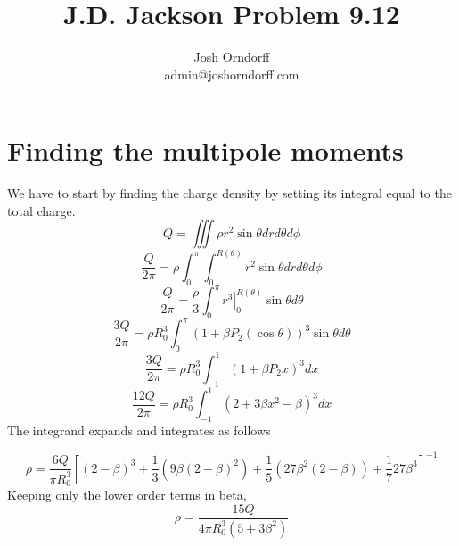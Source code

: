 \documentclass[10pt,a4paper]{article}
\begin{document}
\title{J.D. Jackson Problem 9.12}
\author{Josh Orndorff \\ admin@joshorndorff.com}
\maketitle

\section{Finding the multipole moments}
We have to start by finding the charge density by setting its integral equal to the total charge.
\begin{equation}
Q=\iiint \rho r^2 \sin\theta dr d\theta d\phi
\end{equation}
\begin{equation}
\frac{Q}{2\pi}=\rho\int_0^\pi \int_0^{R(\theta)}r^2 \sin\theta dr d\theta d\phi
\end{equation}
\begin{equation}
\frac{Q}{2\pi}=\frac{\rho}{3}\int_0^\pi \left. r^3 \right|_0^{R(\theta)}\sin\theta d\theta
\end{equation}
\begin{equation}
\frac{3Q}{2\pi}=\rho R_0^3\int_{0}^\pi (1+\beta P_2(\cos\theta))^3\sin\theta d\theta
\end{equation}
\begin{equation}
\frac{3Q}{2\pi}=\rho R_0^3\int_{-1}^1 (1+\beta P_2x)^3 dx
\end{equation}
\begin{equation}
\frac{12Q}{2\pi}=\rho R_0^3\int_{-1}^1 (2+3\beta x^2-\beta)^3 dx
\end{equation}
The integrand expands and integrates as follows

\begin{equation}
\rho=\frac{6Q}{\pi R_0^3}\left[
(2-\beta)^3+\frac{1}{3}(9\beta(2-\beta)^2)+\frac{1}{5}(27\beta^2(2-\beta))+\frac{1}{7}27\beta^3
\right]^{-1}
\end{equation}
Keeping only the lower order terms in beta,
\begin{equation}
\rho=\frac{15Q}{4\pi R_0^3(5+3\beta^2)}
\end{equation}
\end{document}
